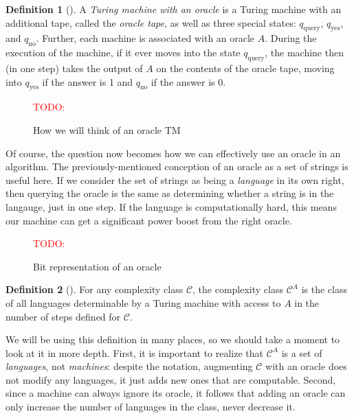 \documentclass[english,12pt]{reedthesis}
\theoremstyle{plain}
\theoremstyle{definition}
\newtheorem{defn}[defn]{Definition}
\theoremstyle{remark}
\newcommand{\TODO}[1]{\textcolor{red}{TODO: #1}}
\begin{document}
\begin{defn}[{\cite[Def.\ 3.6]{AB09}}]\label{def:tm-oracle}
  A \emph{Turing machine with an oracle} is a Turing machine with an additional
  tape, called the \emph{oracle tape}, as well as three special states:
  $q_{\text{query}}$, $q_{\text{yes}}$, and $q_{\text{no}}$. Further, each
  machine is associated with an oracle $A$. During the execution of the machine,
  if it ever moves into the state $q_{\text{query}}$, the machine then (in one
  step) takes the output of $A$ on the contents of the oracle tape, moving into
  $q_{\text{yes}}$ if the answer is 1 and $q_{\text{no}}$ if the answer is 0.
\end{defn}

\begin{figure}[htbp]
  \TODO{}
  \caption{How we will think of an oracle TM}\label{fig:tm:concept}
\end{figure}

Of course, the question now becomes how we can effectively use an oracle in an
algorithm. The previously-mentioned conception of an oracle as a set of strings
is useful here. If we consider the set of strings as being a \emph{language} in
its own right, then querying the oracle is the same as determining whether a
string is in the langauge, just in one step. If the language is computationally
hard, this means our machine can get a significant power boost from the right
oracle.

\begin{figure}[htbp]
  \TODO{}
  \caption{Bit representation of an oracle}\label{fig:oracle-bits}
\end{figure}

\begin{defn}[{\cite[Def.\ 2.1]{AW09}}]\label{def:oracle-class}
  For any complexity class $\mathcal{C}$, the complexity class $\mathcal{C}^{A}$ is the class of all
  languages determinable by a Turing machine with access to $A$ in the number of
  steps defined for $\mathcal{C}$.
\end{defn}

We will be using this definition in many places, so we should take a moment to
look at it in more depth. First, it is important to realize that $\mathcal{C}^{A}$ is a
set of \emph{languages}, not \emph{machines}: despite the notation, augmenting
$\mathcal{C}$ with an oracle does not modify any languages, it just adds new ones that are
computable. Second, since a machine can always ignore its oracle, it follows
that adding an oracle can only increase the number of languages in the class,
never decrease it.
\end{document}
